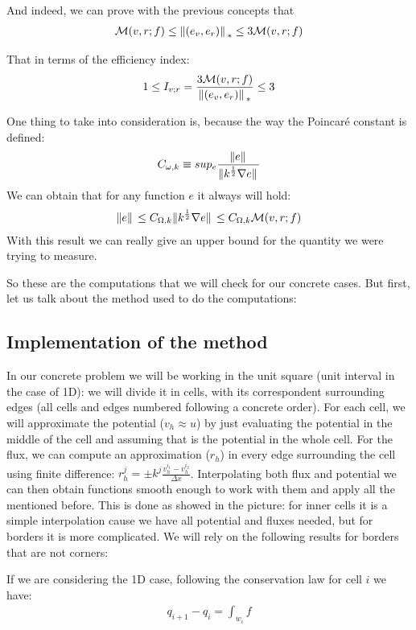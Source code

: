 \documentclass{article}
\begin{document}
	And indeed, we can prove with the previous concepts that 
	\begin{align*}
	\mathcal{M}(v,r;f) \leq  \norm*{(e_v,e_r)}_{*}  \leq 3\mathcal{M}(v,r;f)
	\end{align*}
	
	That in terms of the efficiency index:
	\begin{align*}
	1 \leq I_{v;r} = \frac{3\mathcal{M}(v,r;f)}{\norm*{(e_v, e_r)}_*} \leq 3
	\end{align*}
	
	One thing to take into consideration is, because the way the Poincaré constant is defined:
	\begin{align*}
	C_{\omega,k} \equiv sup_e \frac{\norm*{e}}{\norm*{k^{\frac{1}{2}}\nabla{e}}}
	\end{align*}
	We can obtain that for any function $e$ it always will hold:
	\begin{align*}
	\norm*{e} \leq C_{\Omega,k}\norm*{k^{\frac{1}{2}}\nabla{e}} \leq C_{\Omega,k}\mathcal{M}(v,r;f)
	\end{align*}
	With this result we can really give an upper bound for the quantity we were trying to measure.
	
	So these are the computations that we will check for our concrete cases. But first, let us talk about the method used to do the computations:
	\subsection*{Implementation of the method}
	In our concrete problem we will be working in the unit square (unit interval in the case of 1D): we will divide it in cells, with its correspondent surrounding edges (all cells and edges numbered following a concrete order). For each cell, we will approximate the potential ($v_h \approx u$) by just evaluating the potential in the middle of the cell and assuming that is the potential in the whole cell. For the flux, we can compute an approximation ($r_h$) in every edge surrounding the cell using finite difference: $r_h^j = \pm k^j \frac{v_h^{i_1}- v_h^{i_2}}{\Delta x}$. Interpolating both flux and potential we can then obtain functions smooth enough to work with them and apply all the mentioned before.
	This is done as showed in the picture: for inner cells it is a simple interpolation cause we have all potential and fluxes needed, but for borders it is more complicated. We will rely on the following results for borders that are not corners:
	
	If we are considering the 1D case, following the conservation law for cell $i$ we have:
	\begin{align*}
	q_{i+1} - q_i =  \int_{w_i} f
	\end{align*}
	
\end{document}
